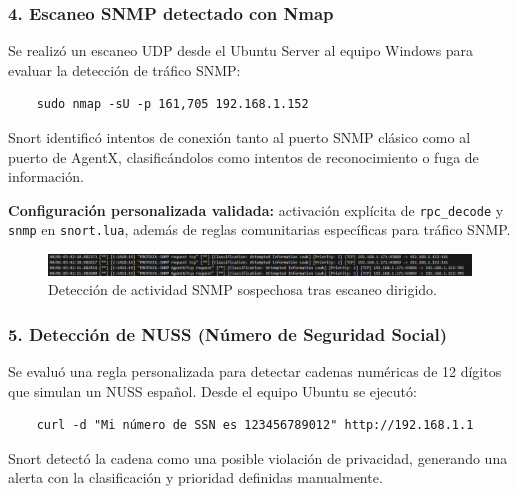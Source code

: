 \documentclass[11pt,a4paper,twoside]{report}
\begin{document}
\vspace{0.5cm}

\subsubsection*{4. Escaneo SNMP detectado con Nmap}

Se realizó un escaneo UDP desde el Ubuntu Server al equipo Windows para evaluar la detección de tráfico SNMP:

\begin{verbatim}
	sudo nmap -sU -p 161,705 192.168.1.152
\end{verbatim}

Snort identificó intentos de conexión tanto al puerto SNMP clásico como al puerto de AgentX, clasificándolos como intentos de reconocimiento o fuga de información.\newline

\textbf{Configuración personalizada validada:} activación explícita de \texttt{rpc\_decode} y \texttt{snmp} en \texttt{snort.lua}, además de reglas comunitarias específicas para tráfico SNMP.

\begin{figure}[H]
	\centering
	\includegraphics[width=\textwidth]{pruebas/5.png}
	\caption{Detección de actividad SNMP sospechosa tras escaneo dirigido.}
\end{figure}

\vspace{0.5cm}

\subsubsection*{5. Detección de NUSS (Número de Seguridad Social)}

Se evaluó una regla personalizada para detectar cadenas numéricas de 12 dígitos que simulan un NUSS español. Desde el equipo Ubuntu se ejecutó:

\begin{verbatim}
	curl -d "Mi número de SSN es 123456789012" http://192.168.1.1
\end{verbatim}

Snort detectó la cadena como una posible violación de privacidad, generando una alerta con la clasificación y prioridad definidas manualmente.\newline
\end{document}
